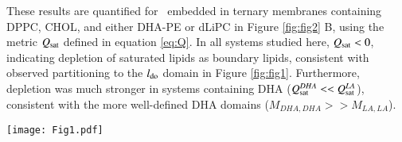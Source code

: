 	{These results are quantified for \nachr~embedded in ternary membranes containing DPPC, CHOL, and either DHA-PE or dLiPC in Figure \ref{fig:fig2} B, using the metric $Q_{\mathrm{sat}}$ defined in equation \ref{eq:Q}.}  %
	In all systems studied here, $Q_{\mathrm{sat}} < 0$, indicating depletion of saturated lipids as boundary lipids, consistent with observed partitioning to the $l_{\mathrm{do}}$ domain in Figure \ref{fig:fig1}. Furthermore, depletion was much stronger in systems containing DHA ($Q_{\mathrm{sat}}^{DHA}<< Q_{\mathrm{sat}}^{LA}$), consistent with the more well-defined DHA domains ($M_{DHA,DHA}>> M_{LA,LA}$). %
		\begin{figure*}[t]
		\center
		\texttt{[image: Fig1.pdf]}
		\caption{ Trajectories of ternary mixtures at ratios of 2:2:1 DPPC:PUFA:Chol. A and B: Trajectories of simulation systems with a single nAChR embedded within small membranes, using lipids containing DHA acyl chains or LA acyl chains. Both simulations were run for 2 $\mu$s. C: Final snapshot of 4 $\mu$s trajectory of a system within a large $\sim$ 75x75 nm$^2$ membrane with the same composition as in A. Subunits are colored: $\alpha$: green, $\beta$: purple, $\delta$: gray, $\gamma$: cyan. Lipids are colored: Chol: red, DPPC: blue, di-DHA-PE: white, DLiPC: tan.} 
		\label{fig:fig1}
	\end{figure*}

